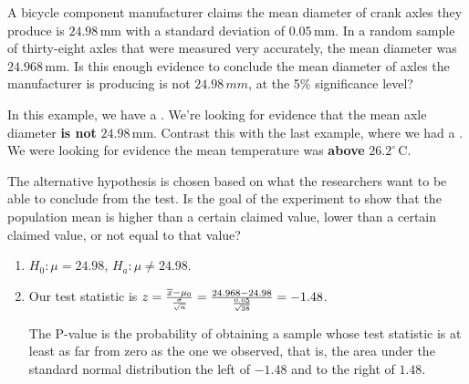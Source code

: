 \begin{example}
A bicycle component manufacturer claims the mean diameter of crank axles they produce is $24.98$\,mm with a standard deviation of $0.05$\,mm. In a random sample of thirty-eight axles that were measured very accurately, the mean diameter was $24.968$\,mm. Is this enough evidence to conclude the mean diameter of axles the manufacturer is producing is not $24.98\,mm$, at the 5\% significance level?

In this example, we have a . We're looking for evidence that the mean axle diameter \textbf{is not} $24.98$\,mm. Contrast this with the last example, where we had a . We were looking for evidence the mean temperature was \textbf{above} $26.2^{\circ}$\,C.

\begin{keypoint}
The alternative hypothesis is chosen based on what the researchers want to be able to conclude from the test. Is the goal of the experiment to show that the population mean is higher than a certain claimed value, lower than a certain claimed value, or not equal to that value?
\end{keypoint}

\begin{enumerate}[label=\textnormal{\Roman*}.]
\item $H_0: \mu = 24.98$, $H_a: \mu \neq 24.98$.

\item Our test statistic is $z = \frac{{\overline{x}} - \mu_{0}}{\frac{\sigma}{\sqrt{n}}} = \frac{24.968 - 24.98}{\frac{0.05}{\sqrt{38}}} = -1.48$.

The P-value is the probability of obtaining a sample whose test statistic is at least as far from zero as the one we observed, that is, the area under the standard normal distribution the left of $-1.48$ and to the right of $1.48$.
\begin{center}
\end{center}
\end{enumerate}
\end{example}
